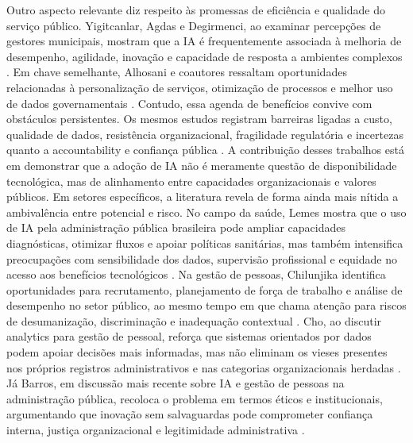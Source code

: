\documentclass[12pt,a4paper]{article}
\begin{document}
Outro aspecto relevante diz respeito às promessas de eficiência e qualidade do serviço público. Yigitcanlar, Agdas e Degirmenci, ao examinar percepções de gestores municipais, mostram que a IA é frequentemente associada à melhoria de desempenho, agilidade, inovação e capacidade de resposta a ambientes complexos \autocite{yiitcanlar2022artificial}. Em chave semelhante, Alhosani e coautores ressaltam oportunidades relacionadas à personalização de serviços, otimização de processos e melhor uso de dados governamentais \autocite{alhosani2024opportunities}. Contudo, essa agenda de benefícios convive com obstáculos persistentes. Os mesmos estudos registram barreiras ligadas a custo, qualidade de dados, resistência organizacional, fragilidade regulatória e incertezas quanto a accountability e confiança pública \autocite{yiitcanlar2022artificial} \autocite{alhosani2024opportunities}. A contribuição desses trabalhos está em demonstrar que a adoção de IA não é meramente questão de disponibilidade tecnológica, mas de alinhamento entre capacidades organizacionais e valores públicos.
Em setores específicos, a literatura revela de forma ainda mais nítida a ambivalência entre potencial e risco. No campo da saúde, Lemes mostra que o uso de IA pela administração pública brasileira pode ampliar capacidades diagnósticas, otimizar fluxos e apoiar políticas sanitárias, mas também intensifica preocupações com sensibilidade dos dados, supervisão profissional e equidade no acesso aos benefícios tecnológicos \autocite{lemes2020o}. Na gestão de pessoas, Chilunjika identifica oportunidades para recrutamento, planejamento de força de trabalho e análise de desempenho no setor público, ao mesmo tempo em que chama atenção para riscos de desumanização, discriminação e inadequação contextual \autocite{chilunjika2022artificial}. Cho, ao discutir analytics para gestão de pessoal, reforça que sistemas orientados por dados podem apoiar decisões mais informadas, mas não eliminam os vieses presentes nos próprios registros administrativos e nas categorias organizacionais herdadas \autocite{cho2023human}. Já Barros, em discussão mais recente sobre IA e gestão de pessoas na administração pública, recoloca o problema em termos éticos e institucionais, argumentando que inovação sem salvaguardas pode comprometer confiança interna, justiça organizacional e legitimidade administrativa \autocite{barros2025inteligencia}.
\end{document}

